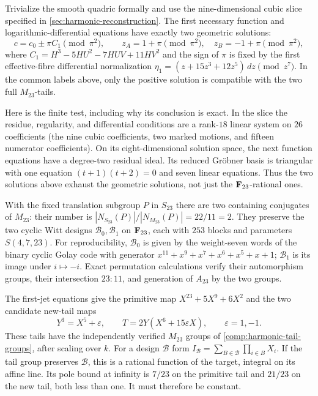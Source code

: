 \begin{computation}
\label{comp:harmonic-first-jet}
Trivialize the smooth quadric formally and use the nine-dimensional
cubic slice specified in \cref{sec:harmonic-reconstruction}.
The first necessary function and logarithmic-differential equations
have exactly two geometric solutions:
\[
 c=c_0\pm\pi C_1\pmod{\pi^2},\qquad
 z_A=1+\pi\pmod{\pi^2},\quad z_B=-1+\pi\pmod{\pi^2},
\]
where $C_1=H^3-5HU^2-7HUV+11HV^2$ and the sign of $\pi$ is fixed
by the first effective-fibre differential normalization
$\eta_1=(z+15z^3+12z^5)\,dz\pmod{z^7}$.
In the common labels above, only the positive solution is compatible
with the two full $M_{23}$-tails.
\end{computation}

Here is the finite test, including why its conclusion is exact.
In the slice the residue, regularity, and differential conditions are
a rank-$18$ linear system on $26$ coefficients (the nine cubic
coefficients, two marked motions, and fifteen numerator coefficients).
On its eight-dimensional solution space, the next function equations
have a degree-two residual ideal.  Its reduced Gr\"obner basis is
triangular with one equation $(t+1)(t+2)=0$ and seven linear
equations.  Thus the two solutions above exhaust the geometric
solutions, not just the $\mathbf F_{23}$-rational ones.

With the fixed translation subgroup $P$ in $S_{23}$ there are two
containing conjugates of $M_{23}$: their number is
$|N_{S_{23}}(P)|/|N_{M_{23}}(P)|=22/11=2$.
They preserve the two cyclic Witt designs $\mathcal B_0,\mathcal B_1$
on $\mathbf F_{23}$, each with $253$ blocks and parameters $S(4,7,23)$.
For reproducibility, $\mathcal B_0$ is given by the weight-seven
words of the binary cyclic Golay code with generator
$x^{11}+x^9+x^7+x^6+x^5+x+1$; $\mathcal B_1$ is its image under
$i\mapsto-i$.  Exact permutation calculations verify their
automorphism groups, their intersection $23{:}11$, and generation
of $A_{23}$ by the two groups.

The first-jet equations give the primitive map
$X^{23}+5X^9+6X^2$ and the two candidate new-tail maps
\[
 Y^3=X^5+\varepsilon,\qquad
 T=2Y(X^6+15\varepsilon X),\qquad \varepsilon=1,-1.
\]
These tails have the independently verified $M_{23}$ groups of
\cref{comp:harmonic-tail-groups}, after scaling over $k$.
For a design $\mathcal B$ form
$I_{\mathcal B}=\sum_{B\in\mathcal B}\prod_{i\in B}X_i$.
If the tail group preserves $\mathcal B$, this is a rational
function of the target, integral on its affine line.  Its pole bound
at infinity is $7/23$ on the primitive tail and $21/23$ on the new
tail, both less than one.  It must therefore be constant.

